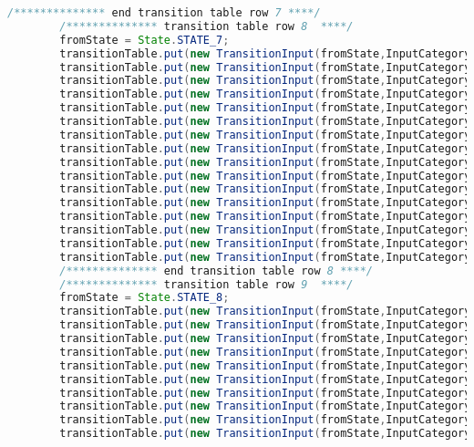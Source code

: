 \begin{lstlisting}[basicstyle=\miniscule,language=Java,caption=Implementation of transition table,label=listing:transition table]
		/************** end transition table row 7 ****/
		/************** transition table row 8  ****/
		fromState = State.STATE_7;
		transitionTable.put(new TransitionInput(fromState,InputCategory.LETTER), fromState);
		transitionTable.put(new TransitionInput(fromState,InputCategory.DIGIT), fromState);
		transitionTable.put(new TransitionInput(fromState,InputCategory.UNDERSCORE), fromState);
		transitionTable.put(new TransitionInput(fromState,InputCategory.SLASH_DIVIDE), fromState);
		transitionTable.put(new TransitionInput(fromState,InputCategory.ASTERISK), State.STATE_8);
		transitionTable.put(new TransitionInput(fromState,InputCategory.LESS_THAN), fromState);
		transitionTable.put(new TransitionInput(fromState,InputCategory.GREATER_THAN), fromState);
		transitionTable.put(new TransitionInput(fromState,InputCategory.PLUS), fromState);
		transitionTable.put(new TransitionInput(fromState,InputCategory.HYPHEN_MINUS), fromState);
		transitionTable.put(new TransitionInput(fromState,InputCategory.EQUAL), fromState);
		transitionTable.put(new TransitionInput(fromState,InputCategory.EXCLAMATION_MARK), fromState);
		transitionTable.put(new TransitionInput(fromState,InputCategory.DOT), fromState);
		transitionTable.put(new TransitionInput(fromState,InputCategory.SINGLE_QUOTE), fromState);
		transitionTable.put(new TransitionInput(fromState,InputCategory.PUNCT), fromState);
		transitionTable.put(new TransitionInput(fromState,InputCategory.OTHER_PRINTABLE), fromState);
		transitionTable.put(new TransitionInput(fromState,InputCategory.LINE_FEED), fromState);
		/************** end transition table row 8 ****/
		/************** transition table row 9  ****/
		fromState = State.STATE_8;
		transitionTable.put(new TransitionInput(fromState,InputCategory.LETTER), State.STATE_7);
		transitionTable.put(new TransitionInput(fromState,InputCategory.DIGIT), State.STATE_7);
		transitionTable.put(new TransitionInput(fromState,InputCategory.UNDERSCORE), State.STATE_7);
		transitionTable.put(new TransitionInput(fromState,InputCategory.SLASH_DIVIDE), State.STATE_9);
		transitionTable.put(new TransitionInput(fromState,InputCategory.ASTERISK), State.STATE_7);
		transitionTable.put(new TransitionInput(fromState,InputCategory.LESS_THAN), State.STATE_7);
		transitionTable.put(new TransitionInput(fromState,InputCategory.GREATER_THAN), State.STATE_7);
		transitionTable.put(new TransitionInput(fromState,InputCategory.PLUS), State.STATE_7);
		transitionTable.put(new TransitionInput(fromState,InputCategory.HYPHEN_MINUS), State.STATE_7);
		transitionTable.put(new TransitionInput(fromState,InputCategory.EQUAL), State.STATE_7);

\end{lstlisting}
